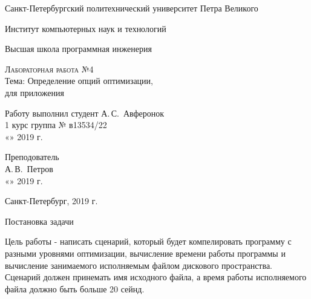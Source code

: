\documentclass[12pt,a4paper]{scrartcl}
\begin{document}
\begin{titlepage}
  \begin{center}
    \large




    \vspace{0.5cm}

    Санкт-Петербургский политехнический университет Петра Великого
    \vspace{0.25cm}
    
    Институт компьютерных наук и технологий
    
    Высшая школа программная инженерия
    \vfill

    \textsc{Лабораторная работа №4}\\[5mm]
    \bigskip
    {\LARGE Тема: Определение опций оптимизации,\\
      для приложения}
  \bigskip
    
    
\end{center}
\vfill

 \newlength{\ML}
\hfill\begin{minipage}{0.5\textwidth}
Работу выполнил студент
  \underline{\hspace{\ML}} А.\,С.~Авферонок\\
1 курс группа № в13534/22\\
  «\underline{\hspace{0.7cm}}» \underline{\hspace{2cm}} 2019 г.
\end{minipage}%
\bigskip
\vfill
 \newlength{\ML}

\hfill\begin{minipage}{0.5\textwidth}
  Преподователь\\
  \underline{\hspace{\ML}} А.\,В.~Петров\\
  «\underline{\hspace{0.7cm}}» \underline{\hspace{2cm}} 2019 г.
\end{minipage}%
\bigskip
\vfill

\begin{center}
  Санкт-Петербург, 2019 г.
\end{center}
\end{titlepage}
\newpage
\begin{center}
    {\LARGE Постановка задачи}
\end{center}
\par
Цель работы - написать сценарий, который будет компелировать программу с разными уровнями оптимизации, 
вычисление времени работы программы и вычисление занимаемого исполняемым файлом дискового пространства.
Сценарий должен принемать имя исходного файла, а время работы исполняемого файла должно быть больше 20 
сейнд.
\end{document}
